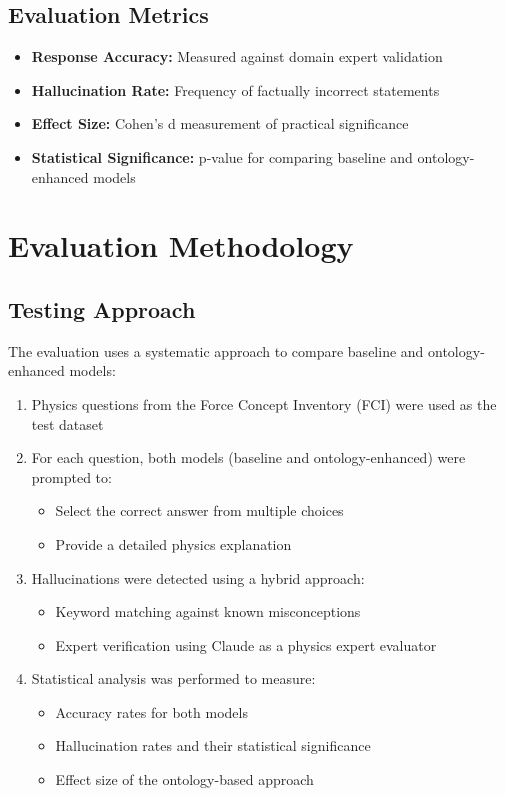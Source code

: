 \subsection{Evaluation Metrics}
\begin{itemize}
    \item \textbf{Response Accuracy:} Measured against domain expert validation~\cite{chen2024comparing}
    \item \textbf{Hallucination Rate:} Frequency of factually incorrect statements~\cite{huang2024survey}
    \item \textbf{Effect Size:} Cohen's d measurement of practical significance
    \item \textbf{Statistical Significance:} p-value for comparing baseline and ontology-enhanced models
\end{itemize}

\section{Evaluation Methodology}
\label{sec:evaluation-methodology}

\subsection{Testing Approach}
The evaluation uses a systematic approach to compare baseline and ontology-enhanced models:

\begin{enumerate}
    \item Physics questions from the Force Concept Inventory (FCI) were used as the test dataset
    \item For each question, both models (baseline and ontology-enhanced) were prompted to:
        \begin{itemize}
            \item Select the correct answer from multiple choices
            \item Provide a detailed physics explanation
        \end{itemize}
    \item Hallucinations were detected using a hybrid approach:
        \begin{itemize}
            \item Keyword matching against known misconceptions
            \item Expert verification using Claude as a physics expert evaluator
        \end{itemize}
    \item Statistical analysis was performed to measure:
        \begin{itemize}
            \item Accuracy rates for both models
            \item Hallucination rates and their statistical significance
            \item Effect size of the ontology-based approach
        \end{itemize}
\end{enumerate}


